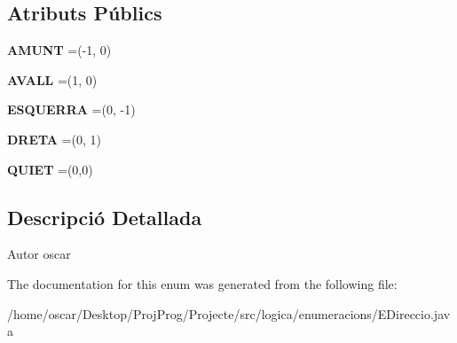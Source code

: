 \subsection*{Atributs Públics}
\begin{DoxyCompactItemize}
\item 
\hypertarget{enumlogica_1_1enumeracions_1_1_e_direccio_a63eeb22e6f9d80a71a098b28e8852e1f}{{\bfseries A\+M\+U\+N\+T} =(-\/1, 0)}\label{enumlogica_1_1enumeracions_1_1_e_direccio_a63eeb22e6f9d80a71a098b28e8852e1f}

\item 
\hypertarget{enumlogica_1_1enumeracions_1_1_e_direccio_aa3a1d108fcda907ca1d07280769f1ec9}{{\bfseries A\+V\+A\+L\+L} =(1, 0)}\label{enumlogica_1_1enumeracions_1_1_e_direccio_aa3a1d108fcda907ca1d07280769f1ec9}

\item 
\hypertarget{enumlogica_1_1enumeracions_1_1_e_direccio_af02594ddfc4fb25ba88bd8b448701f30}{{\bfseries E\+S\+Q\+U\+E\+R\+R\+A} =(0, -\/1)}\label{enumlogica_1_1enumeracions_1_1_e_direccio_af02594ddfc4fb25ba88bd8b448701f30}

\item 
\hypertarget{enumlogica_1_1enumeracions_1_1_e_direccio_afcd65da7e385fd56a4d6bd779e18f241}{{\bfseries D\+R\+E\+T\+A} =(0, 1)}\label{enumlogica_1_1enumeracions_1_1_e_direccio_afcd65da7e385fd56a4d6bd779e18f241}

\item 
\hypertarget{enumlogica_1_1enumeracions_1_1_e_direccio_a252e9ca4de38eba90bca90b4ddc5cb3d}{{\bfseries Q\+U\+I\+E\+T} =(0,0)}\label{enumlogica_1_1enumeracions_1_1_e_direccio_a252e9ca4de38eba90bca90b4ddc5cb3d}

\end{DoxyCompactItemize}


\subsection{Descripció Detallada}
\begin{DoxyAuthor}{Autor}
oscar 
\end{DoxyAuthor}


The documentation for this enum was generated from the following file\+:\begin{DoxyCompactItemize}
\item 
/home/oscar/\+Desktop/\+Proj\+Prog/\+Projecte/src/logica/enumeracions/E\+Direccio.\+java\end{DoxyCompactItemize}
